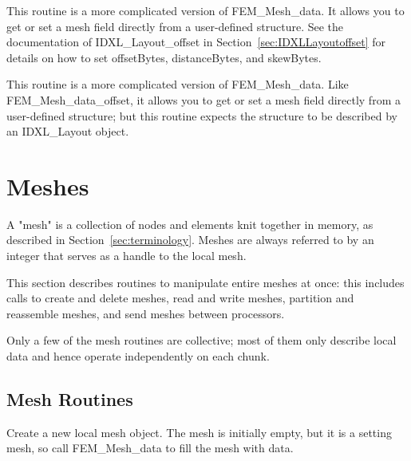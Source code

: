 This routine is a more complicated version of FEM\_Mesh\_data.
It allows you to get or set a mesh field directly
from a user-defined structure.  See the documentation of
IDXL\_Layout\_offset in Section~\ref{sec:IDXLLayoutoffset}
for details on how to set offsetBytes, distanceBytes, and skewBytes.


This routine is a more complicated version of FEM\_Mesh\_data.
Like FEM\_Mesh\_data\_offset, it allows you to get or set a mesh
field directly from a user-defined structure; but this routine
expects the structure to be described by an IDXL\_Layout object.

\section{Meshes}
\label{sec:mesh}

A "mesh" is a collection of nodes and elements 
knit together in memory, as described in Section~\ref{sec:terminology}.
Meshes are always referred to by an integer that 
serves as a handle to the local mesh.

This section describes routines to manipulate entire meshes
at once: this includes calls to create and delete meshes,
read and write meshes,
partition and reassemble meshes, and send meshes between
processors.

Only a few of the mesh routines are collective; 
most of them only describe local data and hence 
operate independently on each chunk.


\subsection{Mesh Routines}


Create a new local mesh object.  The mesh is initially empty,
but it is a setting mesh, so call FEM\_Mesh\_data 
to fill the mesh with data.


